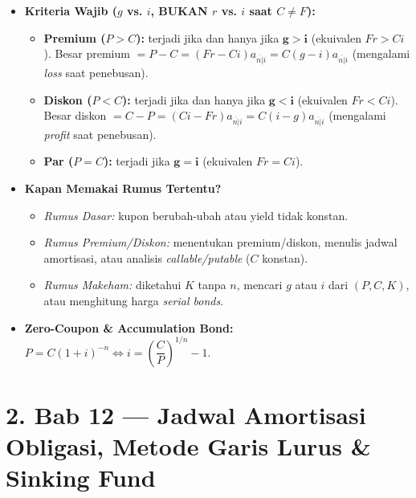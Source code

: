 \documentclass[10pt,a4paper]{article}
\newcommand{\angl}[1]{\overline{#1|}}
\begin{document}
\begin{perhatianbox}
\begin{itemize}[leftmargin=1.5em, topsep=1pt, itemsep=2pt]
    \item \textbf{Kriteria Wajib ($g$ vs. $i$, BUKAN $r$ vs. $i$ saat $C \neq F$):}
    \begin{itemize}[leftmargin=1.2em, topsep=0.5pt, itemsep=1pt]
        \item \textbf{Premium ($P > C$):} terjadi jika dan hanya jika $\mathbf{g > i}$ (ekuivalen $Fr > Ci$). Besar premium $= P - C = (Fr - Ci)a_{\angl{n}i} = C(g - i)a_{\angl{n}i}$ (mengalami \textit{loss} saat penebusan).
        \item \textbf{Diskon ($P < C$):} terjadi jika dan hanya jika $\mathbf{g < i}$ (ekuivalen $Fr < Ci$). Besar diskon $= C - P = (Ci - Fr)a_{\angl{n}i} = C(i - g)a_{\angl{n}i}$ (mengalami \textit{profit} saat penebusan).
        \item \textbf{Par ($P = C$):} terjadi jika $\mathbf{g = i}$ (ekuivalen $Fr = Ci$).
    \end{itemize}
    \item \textbf{Kapan Memakai Rumus Tertentu?}
    \begin{itemize}[leftmargin=1.2em, topsep=0.5pt, itemsep=1pt]
        \item \textit{Rumus Dasar:} kupon berubah-ubah atau yield tidak konstan.
        \item \textit{Rumus Premium/Diskon:} menentukan premium/diskon, menulis jadwal amortisasi, atau analisis \textit{callable/putable} ($C$ konstan).
        \item \textit{Rumus Makeham:} diketahui $K$ tanpa $n$, mencari $g$ atau $i$ dari $(P, C, K)$, atau menghitung harga \textit{serial bonds}.
    \end{itemize}
    \item \textbf{Zero-Coupon \& Accumulation Bond:} $P = C(1+i)^{-n} \iff i = \left(\dfrac{C}{P}\right)^{1/n} - 1$.
\end{itemize}
\end{perhatianbox}

\section*{\large 2. Bab 12 --- Jadwal Amortisasi Obligasi, Metode Garis Lurus \& Sinking Fund}
\end{document}
